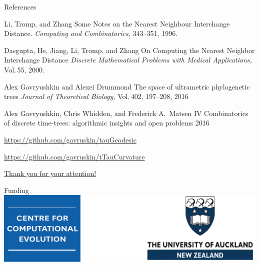 \documentclass{beamer}
\begin{document}
\begin{frame}{References}


\scriptsize

Li, Tromp, and Zhang
\newblock Some Notes on the Nearest Neighbour Interchange Distance.
\newblock \emph{Computing and Combinatorics,} 343--351, 1996.

Dasgupta, He, Jiang, Li, Tromp, and Zhang
\newblock On Computing the Nearest Neighbor Interchange Distance
\newblock \emph{Discrete Mathematical Problems with Medical Applications,} Vol.\,55, 2000.

Alex Gavryushkin and Alexei Drummond
\newblock The space of ultrametric phylogenetic trees
\newblock \emph{Journal of Theoretical Biology,} Vol.\,402, 197--208, 2016

Alex Gavryushkin, Chris Whidden, and Frederick A.\ Matsen IV
\newblock Combinatorics of discrete time-trees: algorithmic insights and open problems
 2016

\url{https://github.com/gavruskin/tauGeodesic}

\url{https://github.com/gavruskin/tTauCurvature}
\end{frame}

\begin{frame}{\href{http://alex.gavruskin.com/pictures/}{\Large{Thank you for your attention!}}}
\begin{block}{Funding}
\centering
\includegraphics[width=\framewidth]{UniAuckland.png}
\end{block}
\end{frame}
\end{document}
